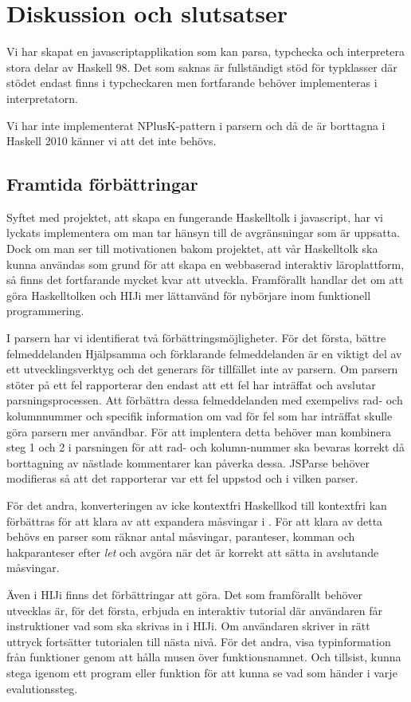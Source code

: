 \section{Diskussion och slutsatser}
Vi har skapat en javascriptapplikation som kan parsa, typchecka och interpretera stora delar av Haskell 98. Det som saknas är fullständigt stöd för typklasser där 
stödet endast finns i typcheckaren men fortfarande behöver implementeras i interpretatorn.

Vi har inte implementerat NPlusK-pattern i parsern och då de är borttagna i Haskell 2010 känner vi att det inte behövs.



\subsection{Framtida förbättringar}

Syftet med projektet, att skapa en fungerande Haskelltolk i javascript, har vi lyckats implementera om man tar hänsyn till de avgränsningar som är uppsatta. Dock om man ser till motivationen bakom projektet, att vår Haskelltolk ska kunna användas som grund för att skapa en webbaserad interaktiv läroplattform, så finns det fortfarande mycket kvar att utveckla. Framförallt handlar det om att göra Haskelltolken och HIJi mer lättanvänd för nybörjare inom funktionell programmering.

I parsern har vi identifierat två förbättringsmöjligheter. För det första, bättre felmeddelanden
Hjälpsamma och förklarande felmeddelanden är en viktigt del av ett utvecklingsverktyg och det generars för tillfället inte av parsern. 
Om parsern stöter på ett fel rapporterar den endast att ett fel har inträffat och avslutar parsningsprocessen. 
Att förbättra dessa felmeddelanden med exempelivs rad- och kolumnnummer och specifik information om vad för fel som har inträffat skulle göra parsern mer användbar.
För att implentera detta behöver man kombinera steg 1 och 2 i parsningen för att rad- och kolumn-nummer ska bevaras korrekt då borttagning av nästlade kommentarer kan påverka dessa.
JSParse behöver modifieras så att det rapporterar var ett fel uppstod och i vilken parser.

För det andra, konverteringen av icke kontextfri Haskellkod till kontextfri kan förbättras 
för att klara av att expandera måsvingar i \empth{[x | let x = 5]}. 
För att klara av detta behövs en parser som räknar antal måsvingar, paranteser, 
komman och hakparanteser efter \emph{let} och avgöra när det är korrekt att sätta in avslutande måsvingar.

Även i HIJi finns det förbättringar att göra.
Det som framförallt behöver utvecklas är, för det första, erbjuda en interaktiv tutorial där användaren får instruktioner vad som ska skrivas in i HIJi. Om användaren skriver in rätt uttryck fortsätter tutorialen till nästa nivå.
För det andra, visa typinformation från funktioner genom att hålla musen över funktionsnamnet.
Och tillsist, kunna stega igenom ett program eller funktion för att kunna se vad som händer i varje evalutionssteg. 
